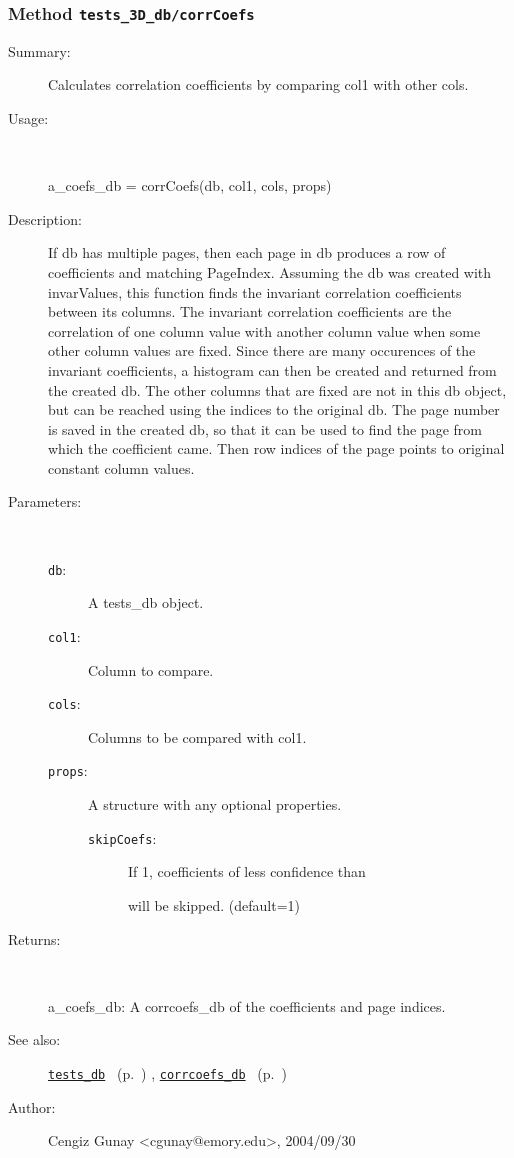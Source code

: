 \subsubsection[Method \texttt{corrCoefs}]{Method \texttt{tests\_3D\_db/corrCoefs}}%
%
\label{ref_tests_3D_db__corrCoefs}%
\hypertarget{ref_tests_3D_db__corrCoefs}{}%
\begin{description}
\item[Summary:]Calculates correlation coefficients by comparing col1 with other cols. 
%
\item[Usage:]~%
\begin{lyxcode}%
a\_coefs\_db = corrCoefs(db, col1, cols, props)
%
\end{lyxcode}%
%
\item[Description:]%
If db has multiple pages, then each page in db produces a row of
 coefficients and matching PageIndex. Assuming the db was created with
 invarValues, this function finds the invariant correlation coefficients
 between its columns. The invariant correlation coefficients are the
 correlation of one column value with another column value when some other
 column values are fixed.  Since there are many occurences of the invariant
 coefficients, a histogram can then be created and returned from the
 created db. The other columns that are fixed are not in this db object,
 but can be reached using the indices to the original db. The page
 number is saved in the created db, so that it can be used to find the page
 from which the coefficient came. Then row indices of the page points to
 original constant column values.
\item[Parameters:]~
\begin{description}%
\item[\texttt{db}:]
 A tests\_db object.
\item[\texttt{col1}:]
 Column to compare.
\item[\texttt{cols}:]
 Columns to be compared with col1.
\item[\texttt{props}:]
 A structure with any optional properties.
\begin{description}%
\item[\texttt{skipCoefs}:]
 If 1, coefficients of less confidence than %

will be skipped. (default=1)
\end{description}%
\end{description}%
%
\item[Returns:
]~

	a\_coefs\_db: A corrcoefs\_db of the coefficients and page indices.
%
%
\item[See also:]%
\hyperlink{ref_tests_db}{\texttt{tests\_db}}%
\ (p.~\pageref{ref_tests_db})%
%
, \hyperlink{ref_corrcoefs_db}{\texttt{corrcoefs\_db}}%
\ (p.~\pageref{ref_corrcoefs_db})%
%
%
\item[Author:]%
Cengiz Gunay <cgunay@emory.edu>, 2004/09/30
%
\end{description}
\methodline%
